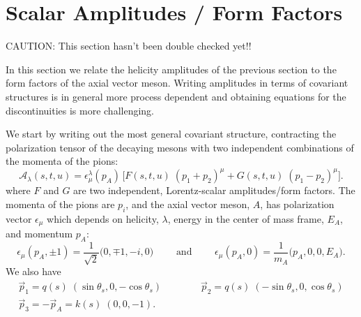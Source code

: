\documentclass[10pt, aps,prd,amsmath,amssymb,superscriptaddress,onecolumn,
nofootinbib,showpacs,preprintnumbers]{revtex4-1}
\begin{document}
\section{Scalar Amplitudes / Form Factors}

\begin{center}
  {\color{red} CAUTION: This section hasn't been double checked yet!!}
\end{center}


In this section we relate the helicity amplitudes of the previous section to the form factors of the axial vector meson. Writing amplitudes in terms of covariant structures is in general more process dependent and obtaining equations for the discontinuities is more challenging.

  We start by writing out the most general covariant structure, contracting the polarization tensor of the decaying mesons with two independent combinations of the momenta of the pions:
  \begin{equation}
    \label{eq:covariant}
    \mathcal{A}_\lambda(s,t,u) = \epsilon_\mu^\lambda(p_A) \, \bigg[ F(s,t,u) \; (p_1 + p_2)^\mu + G(s,t,u) \;  (p_1 - p_2)^\mu \bigg].
    \end{equation}
where \(F\) and \(G\) are two independent, Lorentz-scalar amplitudes/form factors. The momenta of the pions are \(p_i\), and the axial vector meson, \(A\), has polarization vector \(\epsilon_\mu\) which depends on helicity, \(\lambda\), energy in the center of mass frame, \(E_A\), and momentum \(p_A\):
  \begin{equation}
    \label{eq:polarization}
    \epsilon_\mu(p_A, \pm1) = \frac{1}{\sqrt{2}} \big( 0, \mp 1, - i, 0 \big) \qquad \text{ and } \qquad \epsilon_\mu(p_A, 0) = \frac{1}{m_A} \big( p_A, 0, 0, E_A \big).
    \end{equation}
We also have
  \begin{gather}
    \vec{p}_1 = q(s) \; (\sin \theta_s, 0,  -\cos \theta_s) \qquad \qquad \vec{p}_2 = q(s) \; (-\sin \theta_s, 0 , \cos \theta_s ) \\
    \vec{p}_3 = - \vec{p}_A = k(s) \; (0,0,-1). \nonumber
  \end{gather}
\end{document}

